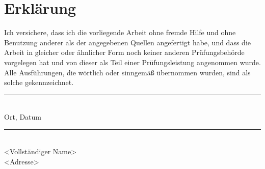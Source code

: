 \chapter*{Erklärung}
\thispagestyle{empty}

\noindent
Ich versichere, dass ich die vorliegende Arbeit ohne fremde Hilfe und ohne Benutzung anderer als der angegebenen Quellen angefertigt habe, und dass die Arbeit in gleicher oder ähnlicher Form noch keiner anderen Prüfungsbehörde vorgelegen hat und von dieser als Teil einer Prüfungsleistung angenommen wurde.
Alle Ausführungen, die wörtlich oder sinngemäß übernommen wurden, sind als solche gekennzeichnet.

\vspace{3cm}

\begin{minipage}[t]{0.45\textwidth}
    \rule{\textwidth}{0.5pt}\\
	Ort, Datum
\end{minipage}
\hfill
\begin{minipage}[t]{0.45\textwidth}
	\rule{\textwidth}{0.5pt}\\
	<Vollständiger Name>\\
    <Adresse>
\end{minipage}
